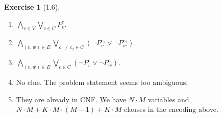 \documentclass[12pt, psamsfonts]{amsart}
\theoremstyle{definition}
\newtheorem*{exer}{Exercise}
\theoremstyle{remark}
\numberwithin{equation}{subsection}
\begin{document}
\begin{exer}[1.6]
    $ $
    \begin{enumerate}[label=(\alph*)]
        \item
            $\bigwedge\limits_{v \in V} \bigvee\limits_{c \in C} P^c_v$.
        \item
            $\bigwedge\limits_{(v, w) \in E} \bigvee\limits_{c_1 \ne c_2 \in C} (\neg P_v^{c_1} \vee \neg P^{c_2}_w)$.
        \item
            $\bigwedge\limits_{(v, w) \in E} \bigvee\limits_{c \in C} (\neg P_v^c \vee \neg P^c_w)$.
        \item
            No clue.
            The problem statement seems too ambiguous.
        \item
            They are already in CNF.
            We have $N \cdot M$ variables and $N \cdot M + K \cdot M \cdot (M - 1) + K \cdot M$ clauses in the encoding above.
    \end{enumerate}
\end{exer}
\end{document}
